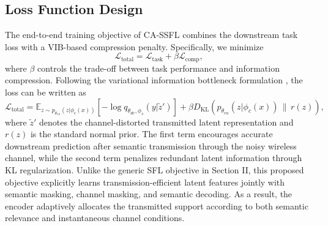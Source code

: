 \subsection{Loss Function Design}
The end-to-end training objective of CA-SSFL combines the downstream task loss with a VIB-based compression penalty. Specifically, we minimize
\begin{equation}
\mathcal{L}_{\mathrm{total}} = \mathcal{L}_{\mathrm{task}} + \beta \mathcal{L}_{\mathrm{comp}},
\end{equation}
where $\beta$ controls the trade-off between task performance and information compression. Following the variational information bottleneck formulation \cite{alemi2017deep,wang2023performance}, the loss can be written as
\begin{equation}
\mathcal{L}_{\mathrm{total}}
=
\mathbb{E}_{z \sim p_{\theta_{en}}(z|\phi_c(x))}
\left[-\log q_{\theta_{de},\phi_s}(y|\tilde{z}')\right]
+ \beta D_{\mathrm{KL}}\!\left(p_{\theta_{en}}(z|\phi_c(x)) \,\|\, r(z)\right),
\end{equation}
where $\tilde{z}'$ denotes the channel-distorted transmitted latent representation and $r(z)$ is the standard normal prior. The first term encourages accurate downstream prediction after semantic transmission through the noisy wireless channel, while the second term penalizes redundant latent information through KL regularization. Unlike the generic SFL objective in Section II, this proposed objective explicitly learns transmission-efficient latent features jointly with semantic masking, channel masking, and semantic decoding. As a result, the encoder adaptively allocates the transmitted support according to both semantic relevance and instantaneous channel conditions.
